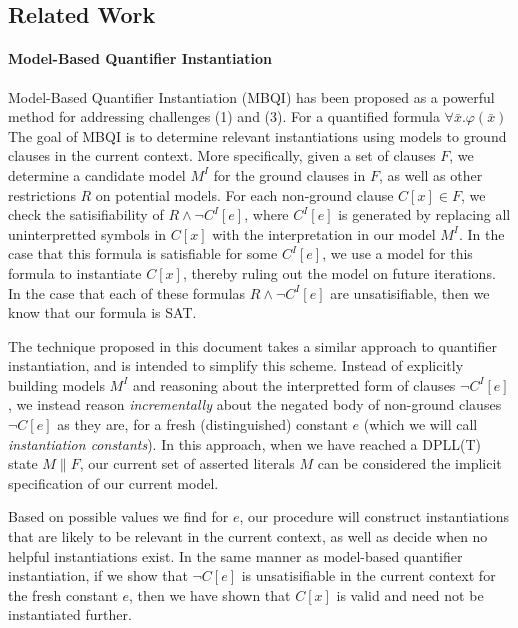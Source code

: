 \documentclass{llncs}
\begin{document}
\subsection{Related Work}

\paragraph{Model-Based Quantifier Instantiation}
Model-Based Quantifier Instantiation (MBQI) has been proposed as a powerful method for addressing challenges (1) and (3).
For a quantified formula $\forall \bar{x}. \varphi(\bar{x})$
The goal of MBQI is to determine relevant instantiations using models to ground clauses in the current context.
More specifically, given a set of clauses $F$, we determine a candidate model $M^I$ for the ground clauses in $F$, as well as other restrictions $R$ on potential models.
For each non-ground clause $C[x] \in F$, we check the satisifiability of $R \wedge \neg C^I[e]$, where $C^I[e]$ is generated by replacing all uninterpretted symbols in $C[x]$ with the interpretation in our model $M^I$.
In the case that this formula is satisfiable for some $C^I[e]$, we use a model for this formula to instantiate $C[x]$, thereby ruling out the model on future iterations.
In the case that each of these formulas $R \wedge \neg C^I[e]$ are unsatisifiable, then we know that our formula is SAT.


The technique proposed in this document takes a similar approach to quantifier instantiation, and is intended to simplify this scheme.
Instead of explicitly building models $M^I$ and reasoning about the interpretted form of clauses $\neg C^I[e]$, we instead reason \emph{incrementally} about the negated body of non-ground clauses $\neg C[e]$ as they are, for a fresh (distinguished) constant $e$ (which we will call \emph{instantiation constants}).
In this approach, when we have reached a DPLL(T) state $M \parallel F$, our current set of asserted literals $M$ can be considered the implicit specification of our current model.

Based on possible values we find for $e$, our procedure will construct instantiations that are likely to be relevant in the current context, as well as decide when no helpful instantiations exist.
In the same manner as model-based quantifier instantiation, if we show that $\neg C[e]$ is unsatisifiable in the current context for the fresh constant $e$, then we have shown that $C[x]$ is valid and need not be instantiated further.
\end{document}
